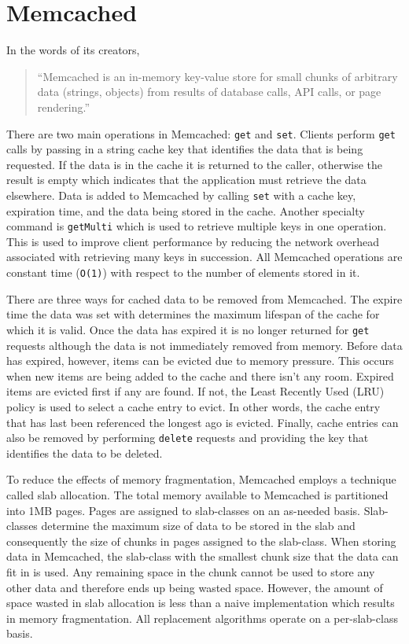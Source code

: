 \documentclass[12pt]{ucthesis}
\begin{document}
\section{Memcached}
In the words of its creators, \begin{quotation}``Memcached is an in-memory key-value store for small chunks of arbitrary data (strings, objects) from results of database calls, API calls, or page rendering.\cite{memcachedDotOrg}''\end{quotation}
There are two main operations in {\textsf Memcached}: {\tt get} and {\tt set}.
Clients perform {\tt get} calls by passing in a string cache key that identifies the data that is being requested.
If the data is in the cache it is returned to the caller, otherwise the result is empty which indicates that the application must retrieve the data elsewhere.
Data is added to {\textsf Memcached} by calling {\tt set} with a cache key, expiration time, and the data being stored in the cache.
Another specialty command is {\tt getMulti} which is used to retrieve multiple keys in one operation.
This is used to improve client performance by reducing the network overhead associated with retrieving many keys in succession.
All {\textsf Memcached} operations are constant time ({\tt O(1)}) with respect to the number of elements stored in it.

There are three ways for cached data to be removed from {\textsf Memcached}.
The expire time the data was set with determines the maximum lifespan of the cache for which it is valid.
Once the data has expired it is no longer returned for {\tt get} requests although the data is not immediately removed from memory.
Before data has expired, however, items can be evicted due to memory pressure.
This occurs when new items are being added to the cache and there isn't any room.
Expired items are evicted first if any are found.
If not, the Least Recently Used (LRU) policy is used to select a cache entry to evict.
In other words, the cache entry that has last been referenced the longest ago is evicted.
Finally, cache entries can also be removed by performing {\tt delete} requests and providing the key that identifies the data to be deleted.

To reduce the effects of memory fragmentation, {\textsf Memcached} employs a technique called slab allocation.
The total memory available to {\textsf Memcached} is partitioned into 1MB pages.
Pages are assigned to slab-classes on an as-needed basis.
Slab-classes determine the maximum size of data to be stored in the slab and consequently the size of chunks in pages assigned to the slab-class.
When storing data in {\textsf Memcached}, the slab-class with the smallest chunk size that the data can fit in is used.
Any remaining space in the chunk cannot be used to store any other data and therefore ends up being wasted space.
However, the amount of space wasted in slab allocation is less than a naive implementation which results in memory fragmentation.
All replacement algorithms operate on a per-slab-class basis.
\end{document}
